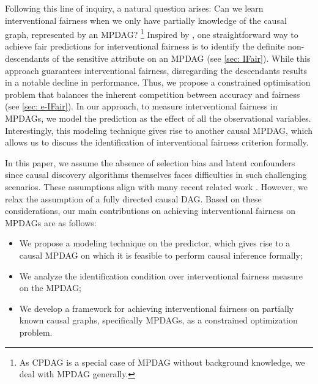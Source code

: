 \documentclass{article} %
\begin{document}
Following this line of inquiry, a natural question arises: Can we learn interventional fairness when we only have partially knowledge of the causal graph, represented by an MPDAG? \footnote{As CPDAG is a special case of MPDAG without background knowledge, we deal with MPDAG generally.} 
Inspired by \citet{zuo2022counterfactual}, one straightforward way to achieve fair predictions for interventional fairness is to identify the definite non-descendants of the sensitive attribute on an MPDAG (see \cref{sec: IFair}). While this approach guarantees interventional fairness, disregarding the descendants results in a notable decline in performance. Thus, we propose a constrained optimisation problem that balances the inherent competition between accuracy and fairness (see \cref{sec: e-IFair}).
In our approach, to measure interventional fairness in MPDAGs, we model the prediction as the effect of all the observational variables. Interestingly, this modeling technique gives rise to another causal MPDAG, which allows us to discuss the identification of interventional fairness criterion formally. %

In this paper, we assume the absence of selection bias and latent confounders since causal discovery algorithms themselves faces difficulties in such challenging scenarios. These assumptions align with many recent related work \citep{zhang2017causal, chiappa2019path, chikahara2021learning, wu2019counterfactual}. However, we relax the assumption of a fully directed causal DAG. Based on these considerations, our main contributions on achieving interventional fairness on MPDAGs are as follows:   
\begin{itemize}
\itemsep0em
    \item We propose a modeling technique on the predictor, which gives rise to a causal MPDAG on which it is feasible to perform causal inference formally;
    \item We analyze the identification condition over interventional fairness measure on the MPDAG;
    \item We develop a framework for achieving interventional fairness on partially known causal graphs, specifically MPDAGs, as a constrained optimization problem.
\end{itemize}
\end{document}
